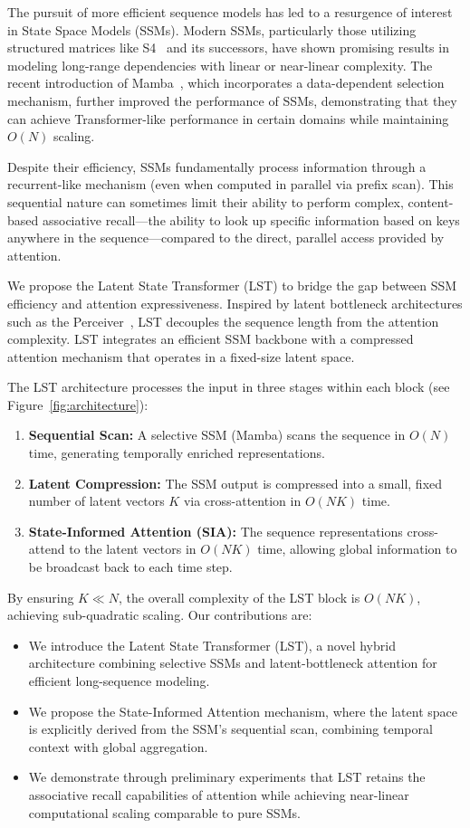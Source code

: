 \documentclass[10pt,twocolumn,letterpaper]{article}
\begin{document}
The pursuit of more efficient sequence models has led to a resurgence of interest in State Space Models (SSMs). Modern SSMs, particularly those utilizing structured matrices like S4~\cite{gu2021efficiently} and its successors, have shown promising results in modeling long-range dependencies with linear or near-linear complexity. The recent introduction of Mamba~\cite{gu2023mamba}, which incorporates a data-dependent selection mechanism, further improved the performance of SSMs, demonstrating that they can achieve Transformer-like performance in certain domains while maintaining \(O(N)\) scaling.

Despite their efficiency, SSMs fundamentally process information through a recurrent-like mechanism (even when computed in parallel via prefix scan). This sequential nature can sometimes limit their ability to perform complex, content-based associative recall—the ability to look up specific information based on keys anywhere in the sequence—compared to the direct, parallel access provided by attention.

We propose the Latent State Transformer (LST) to bridge the gap between SSM efficiency and attention expressiveness. Inspired by latent bottleneck architectures such as the Perceiver~\cite{jaegle2021perceiver}, LST decouples the sequence length from the attention complexity. LST integrates an efficient SSM backbone with a compressed attention mechanism that operates in a fixed-size latent space.

The LST architecture processes the input in three stages within each block (see Figure~\ref{fig:architecture}):
\begin{enumerate}
    \item \textbf{Sequential Scan:} A selective SSM (Mamba) scans the sequence in \(O(N)\) time, generating temporally enriched representations.
    \item \textbf{Latent Compression:} The SSM output is compressed into a small, fixed number of latent vectors \(K\) via cross-attention in \(O(NK)\) time.
    \item \textbf{State-Informed Attention (SIA):} The sequence representations cross-attend to the latent vectors in \(O(NK)\) time, allowing global information to be broadcast back to each time step.
\end{enumerate}

By ensuring \(K \ll N\), the overall complexity of the LST block is \(O(NK)\), achieving sub-quadratic scaling. Our contributions are:
\begin{itemize}
    \item We introduce the Latent State Transformer (LST), a novel hybrid architecture combining selective SSMs and latent-bottleneck attention for efficient long-sequence modeling.
    \item We propose the State-Informed Attention mechanism, where the latent space is explicitly derived from the SSM's sequential scan, combining temporal context with global aggregation.
    \item We demonstrate through preliminary experiments that LST retains the associative recall capabilities of attention while achieving near-linear computational scaling comparable to pure SSMs.
\end{itemize}
\end{document}
